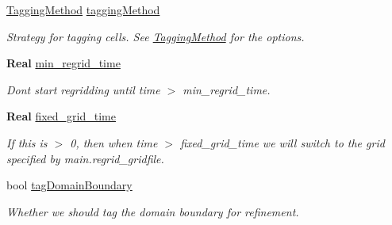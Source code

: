 \begin{DoxyCompactItemize}
\mbox{\label{struct_mushy_layer_options_a825314da4a69c2d426324bcec1392814}} 
\hyperlink{mushy_layer_opt_8h_ab82ea28e90e93c3551db99693337d71c}{Tagging\+Method} \hyperlink{struct_mushy_layer_options_a825314da4a69c2d426324bcec1392814}{tagging\+Method}
\begin{DoxyCompactList}\small\item\em Strategy for tagging cells. See \hyperlink{mushy_layer_opt_8h_ab82ea28e90e93c3551db99693337d71c}{Tagging\+Method} for the options. \end{DoxyCompactList}\item 
\mbox{\label{struct_mushy_layer_options_a6e682ca65188c998a92859fddc1640b9}} 
\textbf{ Real} \hyperlink{struct_mushy_layer_options_a6e682ca65188c998a92859fddc1640b9}{min\+\_\+regrid\+\_\+time}
\begin{DoxyCompactList}\small\item\em Don\textquotesingle{}t start regridding until time $>$ min\+\_\+regrid\+\_\+time. \end{DoxyCompactList}\item 
\mbox{\label{struct_mushy_layer_options_a431749a623ed01eb602eecb39c9b8082}} 
\textbf{ Real} \hyperlink{struct_mushy_layer_options_a431749a623ed01eb602eecb39c9b8082}{fixed\+\_\+grid\+\_\+time}
\begin{DoxyCompactList}\small\item\em If this is $>$ 0, then when time $>$ fixed\+\_\+grid\+\_\+time we will switch to the grid specified by \textquotesingle{}main.\+regrid\+\_\+gridfile\textquotesingle{}. \end{DoxyCompactList}\item 
\mbox{\label{struct_mushy_layer_options_a440b19f2f5f4f6d4987885c916e707fd}} 
bool \hyperlink{struct_mushy_layer_options_a440b19f2f5f4f6d4987885c916e707fd}{tag\+Domain\+Boundary}
\begin{DoxyCompactList}\small\item\em Whether we should tag the domain boundary for refinement. \end{DoxyCompactList}\item 
\mbox{\label{struct_mushy_layer_options_ade35a236c18464420083844e4ad8edc4}} 

\end{DoxyCompactItemize}
